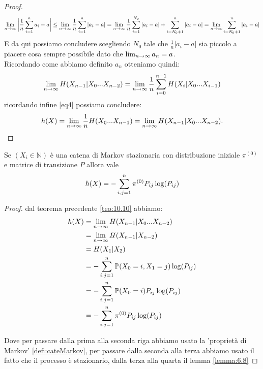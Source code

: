 \begin{proof}
$$\lim_{n\to \infty} \bigg| \frac{1}{n} \sum_{i=1}^n a_i-a \bigg| \leq \lim_{n\to \infty} \frac{1}{n} \sum_{i=1}^n |a_i-a| = \lim_{n\to \infty} \frac{1}{n} \sum_{i=1}^{N_0} |a_i-a| + \sum_{i=N_0+1}^{n} |a_i-a|= \lim_{n\to \infty} \sum_{i=N_0+1}^{n} |a_i-a|$$
E da qui possiamo concludere scegliendo $N_0$ tale che $\frac{1}{n}|a_i-a|$ sia piccolo a piacere cosa sempre possibile dato che $\lim_{n\to \infty} a_n=a$.\\
Ricordando come abbiamo definito $a_n$ otteniamo quindi:
\begin{equation}
\lim_{n\to \infty} H(X_{n-1}|X_0...X_{n-2})=\lim_{n\to \infty} \frac{1}{n} \sum_{i=0}^{n-1}H(X_i|X_0...X_{i-1})
\end{equation}
ricordando infine \ref{eq4} possiamo concludere:
$$h(X)=\lim_{n\to \infty} \frac{1}{n} H(X_0...X_{n-1}) = \lim_{n\to \infty} H(X_{n-1}|X_0...X_{n-2}).$$
\end{proof}
\begin{teo}
Se $(X_i\in \mathbb{N})$ è una catena di Markov stazionaria con distribuzione iniziale $\pi^{(0)}$ e matrice di transizione $P$ allora vale
\begin{equation}
h(X)=-\sum_{i,j=1}^n \pi^{(0)} P_{ij} \log (P_{ij})
\end{equation}
\end{teo}
\begin{proof}
dal teorema precedente \ref{teo:10.10} abbiamo:
\[
\begin{split}
h(X) &=\lim_{n\to \infty} H(X_{n-1}|X_0...X_{n-2})\\
&=\lim_{n\to \infty} H(X_{n-1}|X_{n-2})\\
&=H(X_1|X_2)\\
&=-\sum_{i,j=1}^n \mathbb{P}(X_0=i,X_1=j)\log (P_{ij})\\
&=-\sum_{i,j=1}^n \mathbb{P}(X_0=i)P_{ij}\log (P_{ij})\\
&=-\sum_{i,j=1}^n \pi^{(0)}P_{ij}\log (P_{ij})
\end{split}
\]



Dove per passare dalla prima alla seconda riga abbiamo usato la 'proprietà di Markov' \ref{defi:cateMarkov}, per passare dalla seconda alla terza abbiamo usato il fatto che il processo è stazionario, dalla terza alla quarta il lemma \ref{lemma:6.8}
\end{proof}





